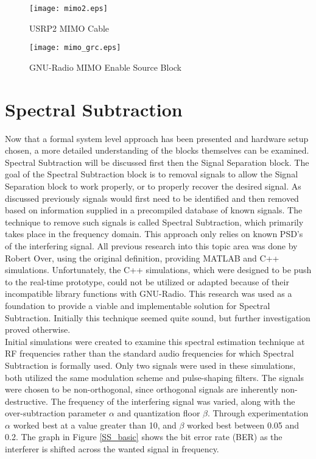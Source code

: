 \begin{figure}[!ht]\label{mimo}
\centering
\texttt{[image: mimo2.eps]}%
\caption{USRP2 MIMO Cable}
\end{figure} 

\begin{figure}[!ht]\label{mimo_grc}
\centering
\texttt{[image: mimo\_grc.eps]}
\caption{GNU-Radio MIMO Enable Source Block}
\end{figure} 


\section{Spectral Subtraction}

Now that a formal system level approach has been presented and hardware setup chosen, a more detailed understanding of the blocks themselves can be examined.  Spectral Subtraction will be discussed first then the Signal Separation block.  The goal of the Spectral Subtraction block is to removal signals to allow the Signal Separation block to work properly, or to properly recover the desired signal.  As discussed previously signals would first need to be identified and then removed based on information supplied in a precompiled database of known signals.  The technique to remove such signals is called Spectral Subtraction, which primarily takes place in the frequency domain.  This approach only relies on known PSD's of the interfering signal.  All previous research into this topic area was done by Robert Over, using the original definition, providing MATLAB and C++ simulations.  Unfortunately, the C++ simulations, which were designed to be push to the real-time prototype, could not be utilized or adapted because of their incompatible library functions with GNU-Radio.  This research was used as a foundation to provide a viable and implementable solution for Spectral Subtraction.  Initially this technique seemed quite sound, but further investigation proved otherwise.\\

Initial simulations were created to examine this spectral estimation technique at RF frequencies rather than the standard audio frequencies for which Spectral Subtraction is formally used.  Only two signals were used in these simulations, both utilized the same modulation scheme and pulse-shaping filters.  The signals were chosen to be non-orthogonal, since orthogonal signals are inherently non-destructive.  The frequency of the interfering signal was varied, along with the over-subtraction parameter \(\alpha\) and quantization floor \(\beta\).  Through experimentation \(\alpha\) worked best at a value greater than 10, and \(\beta\) worked best between 0.05 and 0.2.  The graph in Figure \ref{SS_basic} shows the bit error rate (BER) as the interferer is shifted across the wanted signal in frequency.\\

